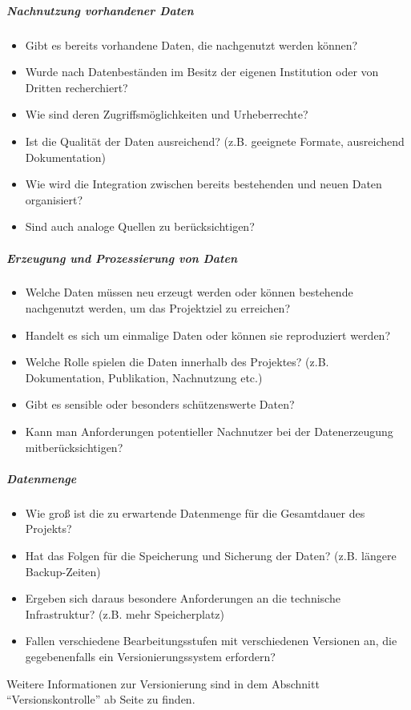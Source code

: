 \subparagraph{Nachnutzung vorhandener Daten}
\begin{itemize}
    \item Gibt es bereits vorhandene Daten, die nachgenutzt werden können?
    \item Wurde nach Datenbeständen im Besitz der eigenen Institution oder von Dritten recherchiert?
    \item Wie sind deren Zugriffsmöglichkeiten und Urheberrechte?
    \item Ist die Qualität der Daten ausreichend? (z.B. geeignete Formate, ausreichend Dokumentation)
    \item Wie wird die Integration zwischen bereits bestehenden und neuen Daten organisiert?
    \item Sind auch analoge Quellen zu berücksichtigen?
\end{itemize}

\subparagraph{Erzeugung und Prozessierung von Daten}
\begin{itemize}
    \item Welche Daten müssen neu erzeugt werden oder können bestehende nachgenutzt werden, um das Projektziel zu erreichen?
    \item Handelt es sich um einmalige Daten oder können sie reproduziert werden?
    \item Welche Rolle spielen die Daten innerhalb des Projektes? (z.B. Dokumentation, Publikation, Nachnutzung etc.)
    \item Gibt es sensible oder besonders schützenswerte Daten?
    \item Kann man Anforderungen potentieller Nachnutzer bei der Datenerzeugung mitberücksichtigen?
\end{itemize}

\subparagraph{Datenmenge}
\begin{itemize}
    \item Wie groß ist die zu erwartende Datenmenge für die Gesamtdauer des Projekts?
    \item Hat das Folgen für die Speicherung und Sicherung der Daten? (z.B. längere Backup-Zeiten)
    \item Ergeben sich daraus besondere Anforderungen an die technische Infrastruktur? (z.B. mehr Speicherplatz)
    \item Fallen verschiedene Bearbeitungsstufen mit verschiedenen Versionen an, die gegebenenfalls ein Versionierungssystem erfordern?
\end{itemize}
Weitere Informationen zur Versionierung sind in dem Abschnitt "`Versionskontrolle"' ab Seite \pageref{versionskontrolle} zu finden.

